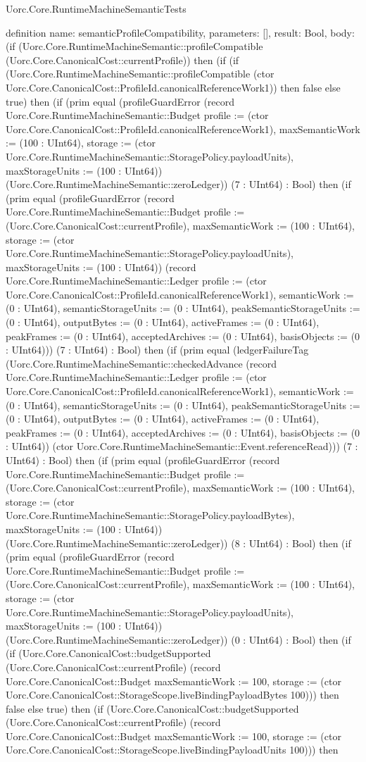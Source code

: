 \begin{lexlean}{Uorc.Core.RuntimeMachineSemanticTests}
\begin{semanticmodule}
definition{
  name: semanticProfileCompatibility,
  parameters: [],
  result: Bool,
  body: (if (Uorc.Core.RuntimeMachineSemantic::profileCompatible (Uorc.Core.CanonicalCost::currentProfile)) then (if (if (Uorc.Core.RuntimeMachineSemantic::profileCompatible (ctor Uorc.Core.CanonicalCost::ProfileId.canonicalReferenceWork1)) then false else true) then (if (prim equal (profileGuardError (record Uorc.Core.RuntimeMachineSemantic::Budget {profile := (ctor Uorc.Core.CanonicalCost::ProfileId.canonicalReferenceWork1), maxSemanticWork := (100 : UInt64), storage := (ctor Uorc.Core.RuntimeMachineSemantic::StoragePolicy.payloadUnits), maxStorageUnits := (100 : UInt64)}) (Uorc.Core.RuntimeMachineSemantic::zeroLedger)) (7 : UInt64) : Bool) then (if (prim equal (profileGuardError (record Uorc.Core.RuntimeMachineSemantic::Budget {profile := (Uorc.Core.CanonicalCost::currentProfile), maxSemanticWork := (100 : UInt64), storage := (ctor Uorc.Core.RuntimeMachineSemantic::StoragePolicy.payloadUnits), maxStorageUnits := (100 : UInt64)}) (record Uorc.Core.RuntimeMachineSemantic::Ledger {profile := (ctor Uorc.Core.CanonicalCost::ProfileId.canonicalReferenceWork1), semanticWork := (0 : UInt64), semanticStorageUnits := (0 : UInt64), peakSemanticStorageUnits := (0 : UInt64), outputBytes := (0 : UInt64), activeFrames := (0 : UInt64), peakFrames := (0 : UInt64), acceptedArchives := (0 : UInt64), basisObjects := (0 : UInt64)})) (7 : UInt64) : Bool) then (if (prim equal (ledgerFailureTag (Uorc.Core.RuntimeMachineSemantic::checkedAdvance (record Uorc.Core.RuntimeMachineSemantic::Ledger {profile := (ctor Uorc.Core.CanonicalCost::ProfileId.canonicalReferenceWork1), semanticWork := (0 : UInt64), semanticStorageUnits := (0 : UInt64), peakSemanticStorageUnits := (0 : UInt64), outputBytes := (0 : UInt64), activeFrames := (0 : UInt64), peakFrames := (0 : UInt64), acceptedArchives := (0 : UInt64), basisObjects := (0 : UInt64)}) (ctor Uorc.Core.RuntimeMachineSemantic::Event.referenceRead))) (7 : UInt64) : Bool) then (if (prim equal (profileGuardError (record Uorc.Core.RuntimeMachineSemantic::Budget {profile := (Uorc.Core.CanonicalCost::currentProfile), maxSemanticWork := (100 : UInt64), storage := (ctor Uorc.Core.RuntimeMachineSemantic::StoragePolicy.payloadBytes), maxStorageUnits := (100 : UInt64)}) (Uorc.Core.RuntimeMachineSemantic::zeroLedger)) (8 : UInt64) : Bool) then (if (prim equal (profileGuardError (record Uorc.Core.RuntimeMachineSemantic::Budget {profile := (Uorc.Core.CanonicalCost::currentProfile), maxSemanticWork := (100 : UInt64), storage := (ctor Uorc.Core.RuntimeMachineSemantic::StoragePolicy.payloadUnits), maxStorageUnits := (100 : UInt64)}) (Uorc.Core.RuntimeMachineSemantic::zeroLedger)) (0 : UInt64) : Bool) then (if (if (Uorc.Core.CanonicalCost::budgetSupported (Uorc.Core.CanonicalCost::currentProfile) (record Uorc.Core.CanonicalCost::Budget {maxSemanticWork := 100, storage := (ctor Uorc.Core.CanonicalCost::StorageScope.liveBindingPayloadBytes 100)})) then false else true) then (if (Uorc.Core.CanonicalCost::budgetSupported (Uorc.Core.CanonicalCost::currentProfile) (record Uorc.Core.CanonicalCost::Budget {maxSemanticWork := 100, storage := (ctor Uorc.Core.CanonicalCost::StorageScope.liveBindingPayloadUnits 100)})) then }
\end{semanticmodule}
\end{lexlean}
